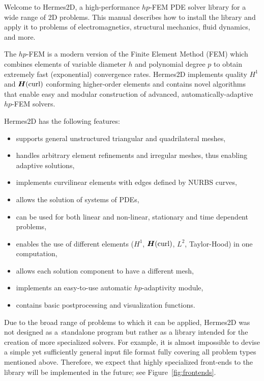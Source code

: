 
Welcome to Hermes2D, a high-performance $hp$-FEM PDE solver library for a wide range
of 2D problems. This manual describes how to install the library and apply it to 
problems of electromagnetics, structural mechanics, fluid dynamics, and more. 

The $hp$-FEM is a modern version of the Finite Element Method (FEM) which
combines elements of variable diameter $h$ and polynomial degree $p$ to obtain
extremely fast (exponential) convergence rates. Hermes2D implements quality $H^1$ and
${\mbox{\boldmath $H$}({\rm curl})}$ conforming higher-order elements and contains novel algorithms
that enable easy and modular construction of advanced, automatically-adaptive 
$hp$-FEM solvers.

Hermes2D has the following features:
\begin{itemize}
  \item supports general unstructured triangular and quadrilateral meshes,
  \item handles arbitrary element refinements and irregular meshes, thus enabling
        adaptive solutions,
  \item implements curvilinear elements with edges defined by NURBS curves,
  \item allows the solution of systems of PDEs,
  \item can be used for both linear and non-linear, stationary and time dependent
        problems,
  \item enables the use of different elements ($H^1$, ${\mbox{\boldmath $H$}({\rm curl})}$, $L^2$, Taylor-Hood) in
        one computation,
  \item allows each solution component to have a different mesh,
  \item implements an easy-to-use automatic $hp$-adaptivity module,
  \item contains basic postprocessing and visualization functions.
\end{itemize}

Due to the broad range of problems to which it can be applied, Hermes2D was not
designed as a~standalone program but rather as a library intended for the creation
of more specialized solvers. For example, it is almost impossible to devise 
a simple yet sufficiently general input file format fully covering all problem
types mentioned above. Therefore, we expect that highly specialized front-ends to
the library will be implemented in the future; see Figure~\ref{fig:frontends}.

